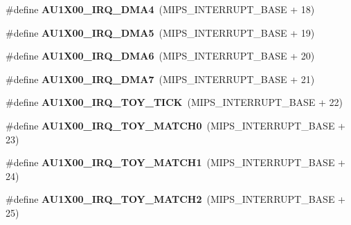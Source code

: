 \begin{DoxyCompactItemize}
\#define {\bfseries A\+U1\+X00\+\_\+\+I\+R\+Q\+\_\+\+D\+M\+A4}~(M\+I\+P\+S\+\_\+\+I\+N\+T\+E\+R\+R\+U\+P\+T\+\_\+\+B\+A\+SE + 18)
\item 
\mbox{\label{group__bsp__interrupt_ga98780e73aac4a5a293494c5fa1d60447}} 
\#define {\bfseries A\+U1\+X00\+\_\+\+I\+R\+Q\+\_\+\+D\+M\+A5}~(M\+I\+P\+S\+\_\+\+I\+N\+T\+E\+R\+R\+U\+P\+T\+\_\+\+B\+A\+SE + 19)
\item 
\mbox{\label{group__bsp__interrupt_ga1e9cc4642dfc8c51e238422c8d23db31}} 
\#define {\bfseries A\+U1\+X00\+\_\+\+I\+R\+Q\+\_\+\+D\+M\+A6}~(M\+I\+P\+S\+\_\+\+I\+N\+T\+E\+R\+R\+U\+P\+T\+\_\+\+B\+A\+SE + 20)
\item 
\mbox{\label{group__bsp__interrupt_gabde23923e7b3cc4b95286efdfed0d4f5}} 
\#define {\bfseries A\+U1\+X00\+\_\+\+I\+R\+Q\+\_\+\+D\+M\+A7}~(M\+I\+P\+S\+\_\+\+I\+N\+T\+E\+R\+R\+U\+P\+T\+\_\+\+B\+A\+SE + 21)
\item 
\mbox{\label{group__bsp__interrupt_gadaf685ef426f977b4a56d15319a5c526}} 
\#define {\bfseries A\+U1\+X00\+\_\+\+I\+R\+Q\+\_\+\+T\+O\+Y\+\_\+\+T\+I\+CK}~(M\+I\+P\+S\+\_\+\+I\+N\+T\+E\+R\+R\+U\+P\+T\+\_\+\+B\+A\+SE + 22)
\item 
\mbox{\label{group__bsp__interrupt_gacb9ee1291ff75c0e89ea35c17385d17e}} 
\#define {\bfseries A\+U1\+X00\+\_\+\+I\+R\+Q\+\_\+\+T\+O\+Y\+\_\+\+M\+A\+T\+C\+H0}~(M\+I\+P\+S\+\_\+\+I\+N\+T\+E\+R\+R\+U\+P\+T\+\_\+\+B\+A\+SE + 23)
\item 
\mbox{\label{group__bsp__interrupt_ga2e11cfb678392204998f25bada2f2334}} 
\#define {\bfseries A\+U1\+X00\+\_\+\+I\+R\+Q\+\_\+\+T\+O\+Y\+\_\+\+M\+A\+T\+C\+H1}~(M\+I\+P\+S\+\_\+\+I\+N\+T\+E\+R\+R\+U\+P\+T\+\_\+\+B\+A\+SE + 24)
\item 
\mbox{\label{group__bsp__interrupt_ga2e5d1345c5d5a8f7d455e4b30aec06ca}} 
\#define {\bfseries A\+U1\+X00\+\_\+\+I\+R\+Q\+\_\+\+T\+O\+Y\+\_\+\+M\+A\+T\+C\+H2}~(M\+I\+P\+S\+\_\+\+I\+N\+T\+E\+R\+R\+U\+P\+T\+\_\+\+B\+A\+SE + 25)
\item 
\mbox{\label{group__bsp__interrupt_gaca77896559636e5526e628db37aca828}} 

\end{DoxyCompactItemize}
